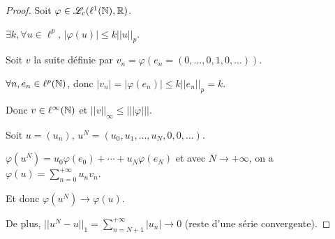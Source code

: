 \begin{proof}
    Soit $\varphi \in \mathscr L_c(\ell^1(\mathbb{N}), \mathbb{R})$.

    $\exists k, \forall u \in \ell^p, \, |\varphi(u)| \leqslant k ||u||_p$.

    Soit $v$ la suite définie par $v_n = \varphi(e_n = (0, \ldots, 0, 1, 0, \ldots))$.

    $\forall n, e_n \in \ell^p(\mathbb{N})$, donc $|v_n| = |\varphi(e_n)| \leqslant k ||e_n||_p = k$.

    Donc $v \in \ell^\infty(\mathbb{N})$ et $||v||_\infty \leqslant |||\varphi|||$. 

    Soit $u = (u_n)$, $u^N = (u_0, u_1, \ldots, u_N, 0, 0, \ldots)$.

    $\varphi(u^N) = u_0 \varphi(e_0) + \cdots + u_N \varphi(e_N)$ 
    et avec $N \to +\infty$, on a
    $\displaystyle \varphi(u) = \sum_{n=0}^{+\infty} u_n v_n$.

    Et donc $\varphi(u^N) \to \varphi(u)$.

    De plus, $\displaystyle ||u^N - u||_1 = \sum_{n=N+1}^{+\infty} |u_n| \to 0$ (reste d'une série convergente).
\end{proof}
